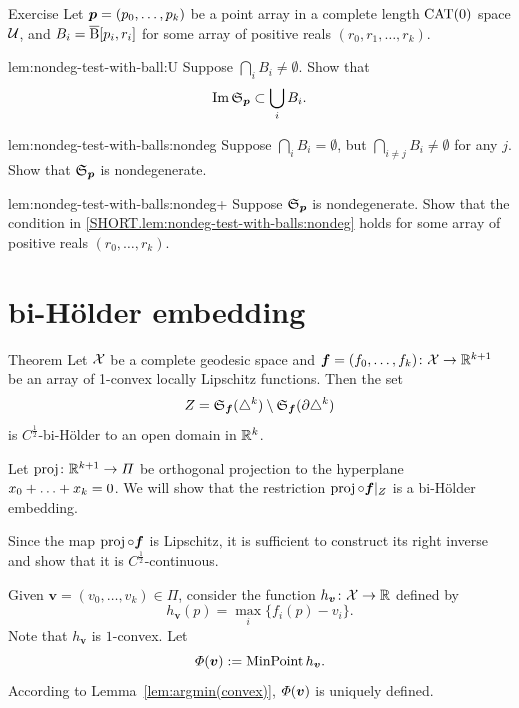 \begin{thm}[!]{Exercise}\label{lem:nondeg-test-with-balls}
Let $\bm{p}\z=(p_0,\ldots, p_k)$ be a point array
in a complete length $\mathrm{CAT}(0)$ space $\mathcal{U}$, 
and $B_i=\overline{\mathrm{B}}{}[p_i,r_i]$ for some array of positive reals $(r_0,r_1,\ldots,r_k)$.

\begin{subthm}{lem:nondeg-test-with-ball:U}
Suppose $\bigcap_i B_i\ne \emptyset$.
Show that 
\[\operatorname{\rm Im}\nolimits\mathfrak{S}_{\bm{p}}\subset \bigcup_i B_i.\]
\end{subthm}

\begin{subthm}{lem:nondeg-test-with-balls:nondeg}
Suppose $\bigcap_i B_i= \emptyset$, but $\bigcap_{i\ne j} B_i\ne \emptyset$ for any $j$.
Show that 
$\mathfrak{S}_{\bm{p}}$ is nondegenerate.
\end{subthm}

\begin{subthm}{lem:nondeg-test-with-balls:nondeg+}
Suppose $\mathfrak{S}_{\bm{p}}$ is nondegenerate.
Show that the condition in \ref{SHORT.lem:nondeg-test-with-balls:nondeg} holds for some
 array of positive reals $(r_0,\ldots,r_k)$.
\end{subthm}

\end{thm}



\section{bi-H\"older embedding}

\begin{thm}{Theorem}\label{thm:bihoelder}
Let $\mathcal{X}$ be a complete geodesic space 
and $\bm{f}\z=(f_0,\z\ldots,f_k)\:\spc{X}\z\to\RR^{k+1}$
be an array of 1-convex locally Lipschitz functions.
Then the set 
\[Z=\mathfrak{S}_{\bm{f}}(\triangle^k)\setminus \mathfrak{S}_{\bm{f}}(\partial \triangle^k)\]
is $C^{\frac12}$-bi-H\"older to an open domain in $\mathbb{R}^k$.
\end{thm}

Let $\operatorname{\rm proj}\nolimits\colon\mathbb{R}^{k+1}\to\varPi$ be orthogonal projection to the hyperplane $x_0+\z\ldots+\nobreak x_k=0$.
We will show that the restriction $\operatorname{\rm proj}\nolimits\circ \bm{f}|_Z$ is a bi-H\"older embedding.

Since the map $\operatorname{\rm proj}\nolimits\circ \bm{f}$ is Lipschitz,
it is sufficient to construct its right inverse and show that it is $C^{\frac12}$-continuous.

Given $\bm{v}=(v_0,\ldots,v_k)\in\Pi$, consider the function
$h_{\bm{v}}\colon \mathcal{X}\to \mathbb{R}$ defined by
\[h_{\bm{v}}(p)=\max_i\{f_i(p)-v_i\}.\]
Note that $h_{\bm{v}}$ is $1$-convex.
Let 
$$\varPhi(\bm{v})\mathrel{:=}\mathop{\rm MinPoint} h_{\bm{v}}.$$
According to Lemma~\ref{lem:argmin(convex)}, $\varPhi(\bm{v})$ is uniquely defined.

